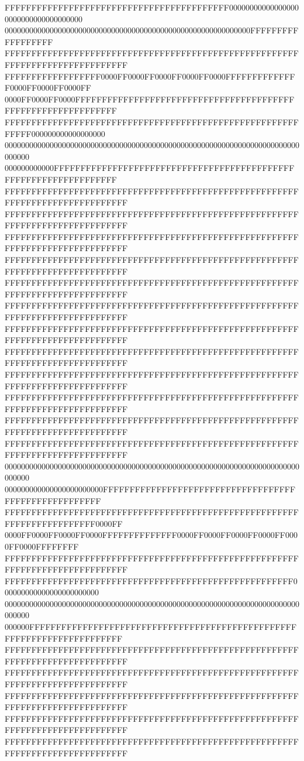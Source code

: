 FFFFFFFFFFFFFFFFFFFFFFFFFFFFFFFFFFFFFFFFFF000000000000000000000000000000000000
000000000000000000000000000000000000000000000000000000000000FFFFFFFFFFFFFFFFFF
FFFFFFFFFFFFFFFFFFFFFFFFFFFFFFFFFFFFFFFFFFFFFFFFFFFFFFFFFFFFFFFFFFFFFFFFFFFFFF
FFFFFFFFFFFFFFFFFF0000FF0000FF0000FF0000FF0000FFFFFFFFFFFFFF0000FF0000FF0000FF
0000FF0000FF0000FFFFFFFFFFFFFFFFFFFFFFFFFFFFFFFFFFFFFFFFFFFFFFFFFFFFFFFFFFFFFF
FFFFFFFFFFFFFFFFFFFFFFFFFFFFFFFFFFFFFFFFFFFFFFFFFFFFFFFFFFFF000000000000000000
000000000000000000000000000000000000000000000000000000000000000000000000000000
000000000000FFFFFFFFFFFFFFFFFFFFFFFFFFFFFFFFFFFFFFFFFFFFFFFFFFFFFFFFFFFFFFFFFF
FFFFFFFFFFFFFFFFFFFFFFFFFFFFFFFFFFFFFFFFFFFFFFFFFFFFFFFFFFFFFFFFFFFFFFFFFFFFFF
FFFFFFFFFFFFFFFFFFFFFFFFFFFFFFFFFFFFFFFFFFFFFFFFFFFFFFFFFFFFFFFFFFFFFFFFFFFFFF
FFFFFFFFFFFFFFFFFFFFFFFFFFFFFFFFFFFFFFFFFFFFFFFFFFFFFFFFFFFFFFFFFFFFFFFFFFFFFF
FFFFFFFFFFFFFFFFFFFFFFFFFFFFFFFFFFFFFFFFFFFFFFFFFFFFFFFFFFFFFFFFFFFFFFFFFFFFFF
FFFFFFFFFFFFFFFFFFFFFFFFFFFFFFFFFFFFFFFFFFFFFFFFFFFFFFFFFFFFFFFFFFFFFFFFFFFFFF
FFFFFFFFFFFFFFFFFFFFFFFFFFFFFFFFFFFFFFFFFFFFFFFFFFFFFFFFFFFFFFFFFFFFFFFFFFFFFF
FFFFFFFFFFFFFFFFFFFFFFFFFFFFFFFFFFFFFFFFFFFFFFFFFFFFFFFFFFFFFFFFFFFFFFFFFFFFFF
FFFFFFFFFFFFFFFFFFFFFFFFFFFFFFFFFFFFFFFFFFFFFFFFFFFFFFFFFFFFFFFFFFFFFFFFFFFFFF
FFFFFFFFFFFFFFFFFFFFFFFFFFFFFFFFFFFFFFFFFFFFFFFFFFFFFFFFFFFFFFFFFFFFFFFFFFFFFF
FFFFFFFFFFFFFFFFFFFFFFFFFFFFFFFFFFFFFFFFFFFFFFFFFFFFFFFFFFFFFFFFFFFFFFFFFFFFFF
FFFFFFFFFFFFFFFFFFFFFFFFFFFFFFFFFFFFFFFFFFFFFFFFFFFFFFFFFFFFFFFFFFFFFFFFFFFFFF
FFFFFFFFFFFFFFFFFFFFFFFFFFFFFFFFFFFFFFFFFFFFFFFFFFFFFFFFFFFFFFFFFFFFFFFFFFFFFF
000000000000000000000000000000000000000000000000000000000000000000000000000000
000000000000000000000000FFFFFFFFFFFFFFFFFFFFFFFFFFFFFFFFFFFFFFFFFFFFFFFFFFFFFF
FFFFFFFFFFFFFFFFFFFFFFFFFFFFFFFFFFFFFFFFFFFFFFFFFFFFFFFFFFFFFFFFFFFFFFFF0000FF
0000FF0000FF0000FF0000FFFFFFFFFFFFFF0000FF0000FF0000FF0000FF0000FF0000FFFFFFFF
FFFFFFFFFFFFFFFFFFFFFFFFFFFFFFFFFFFFFFFFFFFFFFFFFFFFFFFFFFFFFFFFFFFFFFFFFFFFFF
FFFFFFFFFFFFFFFFFFFFFFFFFFFFFFFFFFFFFFFFFFFFFFFFFFFFFF000000000000000000000000
000000000000000000000000000000000000000000000000000000000000000000000000000000
000000FFFFFFFFFFFFFFFFFFFFFFFFFFFFFFFFFFFFFFFFFFFFFFFFFFFFFFFFFFFFFFFFFFFFFFFF
FFFFFFFFFFFFFFFFFFFFFFFFFFFFFFFFFFFFFFFFFFFFFFFFFFFFFFFFFFFFFFFFFFFFFFFFFFFFFF
FFFFFFFFFFFFFFFFFFFFFFFFFFFFFFFFFFFFFFFFFFFFFFFFFFFFFFFFFFFFFFFFFFFFFFFFFFFFFF
FFFFFFFFFFFFFFFFFFFFFFFFFFFFFFFFFFFFFFFFFFFFFFFFFFFFFFFFFFFFFFFFFFFFFFFFFFFFFF
FFFFFFFFFFFFFFFFFFFFFFFFFFFFFFFFFFFFFFFFFFFFFFFFFFFFFFFFFFFFFFFFFFFFFFFFFFFFFF
FFFFFFFFFFFFFFFFFFFFFFFFFFFFFFFFFFFFFFFFFFFFFFFFFFFFFFFFFFFFFFFFFFFFFFFFFFFFFF
